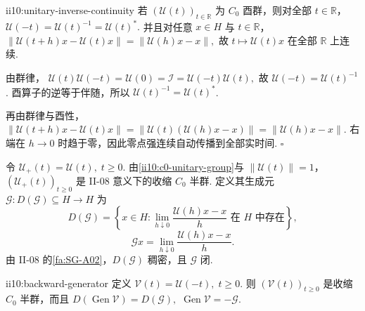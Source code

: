 \begin{FAProposition}{ii10:unitary-inverse-continuity}
若 \(\displaystyle(\mathcal U(t))_{t\in\mathbb R}\) 为 \(\displaystyle C_0\) 酉群，则对全部 \(\displaystyle t\in\mathbb R\)， \(\displaystyle \mathcal U(-t) = \mathcal U(t)^{-1} = \mathcal U(t)^*.\)
并且对任意 \(\displaystyle x\in H\) 与 \(\displaystyle t\in\mathbb R\)， \(\displaystyle \|\mathcal U(t+h)x-\mathcal U(t)x\| = \|\mathcal U(h)x-x\|,\)
故 \(\displaystyle t\mapsto\mathcal U(t)x\) 在全部 \(\displaystyle\mathbb R\) 上连续.
\end{FAProposition}

\begin{FAProof}
由群律， \(\displaystyle \mathcal U(t)\mathcal U(-t) = \mathcal U(0) = \mathcal I = \mathcal U(-t)\mathcal U(t),\)
故 \(\displaystyle\mathcal U(-t)=\mathcal U(t)^{-1}\). 酉算子的逆等于伴随，所以 \(\displaystyle\mathcal U(t)^{-1}=\mathcal U(t)^*\).

再由群律与酉性，\(\displaystyle \|\mathcal U(t+h)x-\mathcal U(t)x\|=\|\mathcal U(t)(\mathcal U(h)x-x)\|=\|\mathcal U(h)x-x\|.\)
右端在 \(\displaystyle h\to0\) 时趋于零，因此零点强连续自动传播到全部实时间.
\hfill\(\square\)
\end{FAProof}

令 \(\displaystyle \mathcal U_+(t)=\mathcal U(t), \; t\geqslant0.\)
由\autoref{ii10:c0-unitary-group}与 \(\displaystyle\|\mathcal U(t)\|=1\)，\(\displaystyle(\mathcal U_+(t))_{t\geqslant0}\) 是 II-08 意义下的收缩 \(\displaystyle C_0\) 半群. 定义其生成元 \(\displaystyle \mathcal G:D(\mathcal G)\subseteq H\to H\)
为
\[
D(\mathcal G)
=
\left\{
 x\in H:
 \lim_{h\downarrow0}\frac{\mathcal U(h)x-x}{h}
 \text{ 在 }H\text{ 中存在}
\right\},
\]
\[
\mathcal Gx
=
\lim_{h\downarrow0}\frac{\mathcal U(h)x-x}{h}.
\]
由 II-08 的\autoref{fa:SG-A02}，\(\displaystyle D(\mathcal G)\) 稠密，且 \(\displaystyle\mathcal G\) 闭.

\begin{FAProposition}[B][反向半群的生成元]{ii10:backward-generator}
定义 \(\displaystyle \mathcal V(t)=\mathcal U(-t), \; t\geqslant0.\)
则 \(\displaystyle(\mathcal V(t))_{t\geqslant0}\) 是收缩 \(\displaystyle C_0\) 半群，而且 \(\displaystyle D(\operatorname{Gen}\mathcal V)=D(\mathcal G),\) \(\displaystyle \operatorname{Gen}\mathcal V=-\mathcal G.\)
\end{FAProposition}

